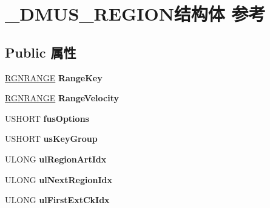 \hypertarget{struct___d_m_u_s___r_e_g_i_o_n}{}\section{\+\_\+\+D\+M\+U\+S\+\_\+\+R\+E\+G\+I\+O\+N结构体 参考}
\label{struct___d_m_u_s___r_e_g_i_o_n}
\subsection*{Public 属性}
\begin{DoxyCompactItemize}
\item 
\mbox{\label{struct___d_m_u_s___r_e_g_i_o_n_a6f1d2f40440e738ef4b663b9a7a50988}} 
\hyperlink{struct___r_g_n_r_a_n_g_e}{R\+G\+N\+R\+A\+N\+GE} {\bfseries Range\+Key}
\item 
\mbox{\label{struct___d_m_u_s___r_e_g_i_o_n_a80c2839de71695a8f10c326cbfbe7897}} 
\hyperlink{struct___r_g_n_r_a_n_g_e}{R\+G\+N\+R\+A\+N\+GE} {\bfseries Range\+Velocity}
\item 
\mbox{\label{struct___d_m_u_s___r_e_g_i_o_n_a9aadfeffe1fb66cf02f66a9867abaae4}} 
U\+S\+H\+O\+RT {\bfseries fus\+Options}
\item 
\mbox{\label{struct___d_m_u_s___r_e_g_i_o_n_a414600850e396872567a90d7daafe69e}} 
U\+S\+H\+O\+RT {\bfseries us\+Key\+Group}
\item 
\mbox{\label{struct___d_m_u_s___r_e_g_i_o_n_a54bc471cd54e05f0fb525215169a718e}} 
U\+L\+O\+NG {\bfseries ul\+Region\+Art\+Idx}
\item 
\mbox{\label{struct___d_m_u_s___r_e_g_i_o_n_a3432ec51c3d85521a8ae82ccfb7c7649}} 
U\+L\+O\+NG {\bfseries ul\+Next\+Region\+Idx}
\item 
\mbox{\label{struct___d_m_u_s___r_e_g_i_o_n_af9c17c3f5fbbbc42a7977727b0348e9d}} 
U\+L\+O\+NG {\bfseries ul\+First\+Ext\+Ck\+Idx}
\item 
\mbox{\label{struct___d_m_u_s___r_e_g_i_o_n_a6f93fd5ad37fcdca3b066c6e435b273a}} 

\end{DoxyCompactItemize}
